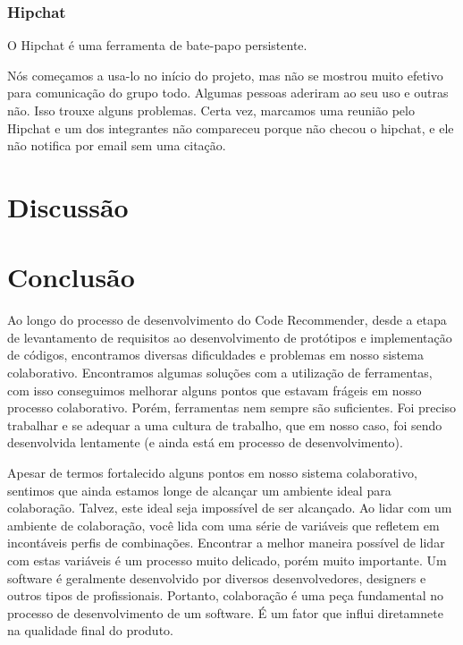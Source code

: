 \documentclass{acm_proc_article-sp}
\begin{document}
\subsubsection{Hipchat}
O Hipchat é uma ferramenta de bate-papo persistente.

Nós começamos a usa-lo no início do projeto, mas não se mostrou muito efetivo
para comunicação do grupo todo. Algumas pessoas aderiram ao seu uso e outras não. Isso trouxe alguns problemas.
Certa vez, marcamos uma reunião pelo Hipchat e um dos integrantes não compareceu porque não checou o hipchat, e ele não notifica por email
sem uma citação.

\section{Discussão}
%

\section{Conclusão}
Ao longo do processo de desenvolvimento do Code Recommender, desde a etapa de levantamento de 
requisitos ao desenvolvimento de protótipos e implementação de códigos, encontramos diversas 
dificuldades e problemas em nosso sistema colaborativo. Encontramos algumas soluções 
com a utilização de ferramentas, com isso conseguimos melhorar alguns pontos que estavam frágeis
em nosso processo colaborativo. Porém, ferramentas nem sempre são suficientes. Foi preciso trabalhar
e se adequar a uma cultura de trabalho, que em nosso caso, foi sendo desenvolvida lentamente (e ainda está
em processo de desenvolvimento). 

Apesar de termos fortalecido alguns pontos em nosso sistema colaborativo, sentimos que ainda estamos longe de alcançar
um ambiente ideal para colaboração. Talvez, este ideal seja impossível de ser alcançado. Ao lidar com um ambiente de colaboração,
você lida com uma série de variáveis que refletem em incontáveis perfis de combinações. Encontrar a melhor maneira possível de 
lidar com estas variáveis é um processo muito delicado, porém muito importante. Um software é geralmente desenvolvido por diversos desenvolvedores, designers e outros tipos de profissionais. Portanto, colaboração é uma peça fundamental no processo de desenvolvimento
de um software. É um fator que influi diretamnete na qualidade final do produto.




%


\balancecolumns
\end{document}
